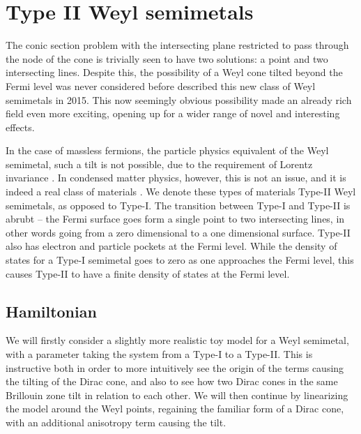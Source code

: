 \section{Type II Weyl semimetals}

The conic section problem with the intersecting plane restricted to pass through the node of the cone is trivially seen to have two solutions: a point and two intersecting lines.
Despite this, the possibility of a Weyl cone tilted beyond the Fermi level was never considered before \citeauthor{soluyanovTypeIIWeylSemimetals2015} described this new class of Weyl semimetals in 2015.
This now seemingly obvious possibility made an already rich field even more exciting, opening up for a wider range of novel and interesting effects.

In the case of massless fermions, the particle physics equivalent of the Weyl semimetal, such a tilt is not possible, due to the requirement of Lorentz invariance .
In condensed matter physics, however, this is not an issue, and it is indeed a real class of materials .
We denote these types of materials Type-II Weyl semimetals, as opposed to Type-I.
The transition between Type-I and Type-II is abrubt -- the Fermi surface goes form a single point to two intersecting lines, in other words going from a zero dimensional to a one dimensional surface.
Type-II also has electron and particle pockets at the Fermi level.
While the density of states for a Type-I semimetal goes to zero as one approaches the Fermi level, this causes Type-II to have a finite density of states at the Fermi level.

\subsection{Hamiltonian}
We will firstly consider a slightly more realistic toy model for a Weyl semimetal, with a parameter taking the system from a Type-I to a Type-II.
This is instructive both in order to more intuitively see the origin of the terms causing the tilting of the Dirac cone, and also to see how two Dirac cones in the same Brillouin zone tilt in relation to each other.
We will then continue by linearizing the model around the Weyl points, regaining the familiar form of a Dirac cone, with an additional anisotropy term causing the tilt.

